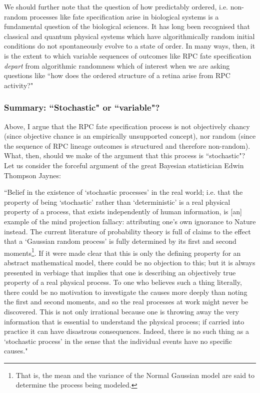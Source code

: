 We should further note that the question of how predictably ordered, i.e. non-random processes like fate specification arise in biological systems is a fundamental question of the biological sciences. It has long been recognised that classical and quantum physical systems which have algorithmically random initial conditions do not spontaneously evolve to a state of order. In many ways, then, it is the extent to which variable sequences of outcomes like RPC fate specification \textit{depart} from algorithmic randomness which of interest when we are asking questions like ``how does the ordered structure of a retina arise from RPC activity?"

\subsubsection{Summary: ``Stochastic" or ``variable"?}

Above, I argue that the RPC fate specification process is not objectively chancy (since objective chance is an empirically unsupported concept), nor random (since the sequence of RPC lineage outcomes is structured and therefore non-random). What, then, should we make of the argument that this process is ``stochastic"? Let us consider the forceful argument of the great Bayesian statistician Edwin Thompson Jaynes:

\begin{longquote}
 ``Belief in the existence of ‘stochastic processes’ in the real world; i.e. that the property of being ‘stochastic’ rather than ‘deterministic’ is a real physical property of a process, that exists independently of human information, is [an] example of the mind projection fallacy: attributing one’s own ignorance to Nature instead. The current literature of probability theory is full of claims to the effect that a ‘Gaussian random process’ is fully determined by its first and second moments\footnote{That is, the mean and the variance of the Normal Gaussian model are said to determine the process being modeled.}. If it were made clear that this is only the defining property for an abstract mathematical model, there could be no objection to this; but it is always presented in verbiage that implies that one is describing an objectively true property of a real physical process. To one who believes such a thing literally, there could be no motivation to investigate the causes more deeply than noting the first and second moments, and so the real processes at work might never be discovered. This is not only irrational because one is throwing away the very information that is essential to understand the physical process; if carried into practice it can have disastrous consequences. Indeed, there is no such thing as a ‘stochastic process’ in the sense that the individual events have no specific causes." \cite{Jaynes2003}
 \end{longquote}
 
